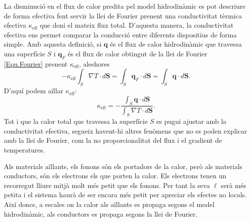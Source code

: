 \documentclass{article}
\begin{document}
La disminuci\'{o} en el flux de calor predita pel model hidrodin\`{a}mic es pot descriure de forma efectiva fent servir la llei de Fourier prenent una conductivitat t\`{e}rmica efectiva $\kappa_{\text{eff}}$ que doni el mateix flux total. D'aquesta manera, la conductivitat efectiva ens permet comparar la conducci\'{o} entre diferents dispositius de forma simple. Amb aquesta definici\'{o}, si $\boldsymbol{q}$ \'{e}s el flux de calor hidrodin\`{a}mic que travessa una superf\'{i}cie $S$ i $\boldsymbol{q}_F$ \'{e}s el flux de calor obtingut de la llei de Fourier \eqref{Equ.Fourier} prenent $\kappa_{\text{eff}}$, aleshores
\[-\kappa_{\text{eff}}\int_S\nabla T\cdot d\boldsymbol{S}=\int_S\boldsymbol{q}_F\cdot d\boldsymbol{S}=\int_S\boldsymbol{q}\cdot d\boldsymbol{S}.\]
D'aqu\'{i} podem a\"{i}llar $\kappa_{\text{eff}}$:
\begin{equation}\label{Equ.keff}
\kappa_{\text{eff}}=-\frac{\int_S\boldsymbol{q}\cdot d\boldsymbol{S}}{\int_S\nabla T\cdot d\boldsymbol{S}}.
\end{equation}
Tot i que la calor total que travessa la superf\'{i}cie $S$ es pugui ajustar amb la conductivitat efectiva, segueix havent-hi altres fen\`{o}mens que no es poden explicar amb la llei de Fourier, com la no proporcionalitat del flux i el gradient de temperatures.
\vspace{4mm}

Als materials a\"{i}llants, els fonons s\'{o}n els portadors de la calor, per\`{o} als materials conductors, s\'{o}n els electrons els que porten la calor. Els electrons tenen un recorregut lliure mitj\`{a} molt m\'{e}s petit que els fonons. Per tant la seva $\ell$ ser\`{a} m\'{e}s petita i el sistema haur\`{a} de ser encara m\'{e}s petit per apreciar els efectes no locals. Aix\'{i} doncs, a escales on la calor als a\"{i}llants es propaga segons el model hidrodin\`{a}mic, als conductors es propaga segons la llei de Fourier.
\vspace{4mm}
\end{document}
